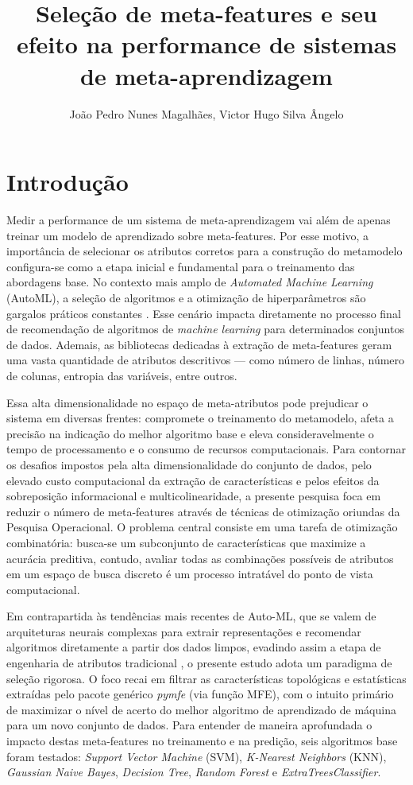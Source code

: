 \documentclass[12pt]{article}
\title{Seleção de meta-features e seu efeito na performance de sistemas de meta-aprendizagem}
\author{João Pedro Nunes Magalhães\inst{1}, Victor Hugo Silva Ângelo\inst{1}}
\begin{document}
 

\maketitle

\section{Introdução}

Medir a performance de um sistema de meta-aprendizagem \cite{vanschoren2018meta} vai além de apenas treinar um modelo de aprendizado sobre meta-features. Por esse motivo, a importância de selecionar os atributos corretos para a construção do metamodelo configura-se como a etapa inicial e fundamental para o treinamento das abordagens base. No contexto mais amplo de \textit{Automated Machine Learning} (AutoML), a seleção de algoritmos e a otimização de hiperparâmetros são gargalos práticos constantes \cite{he2021automl}. Esse cenário impacta diretamente no processo final de recomendação de algoritmos de \textit{machine learning} para determinados conjuntos de dados. Ademais, as bibliotecas dedicadas à extração de meta-features geram uma vasta quantidade de atributos descritivos — como número de linhas, número de colunas, entropia das variáveis, entre outros.

Essa alta dimensionalidade no espaço de meta-atributos pode prejudicar o sistema em diversas frentes: compromete o treinamento do metamodelo, afeta a precisão na indicação do melhor algoritmo base e eleva consideravelmente o tempo de processamento e o consumo de recursos computacionais. Para contornar os desafios impostos pela alta dimensionalidade do conjunto de dados, pelo elevado custo computacional da extração de características e pelos efeitos da sobreposição informacional e multicolinearidade, a presente pesquisa foca em reduzir o número de meta-features através de técnicas de otimização oriundas da Pesquisa Operacional. O problema central consiste em uma tarefa de otimização combinatória: busca-se um subconjunto de características que maximize a acurácia preditiva, contudo, avaliar todas as combinações possíveis de atributos em um espaço de busca discreto é um processo intratável do ponto de vista computacional.

Em contrapartida às tendências mais recentes de Auto-ML, que se valem de arquiteturas neurais complexas para extrair representações e recomendar algoritmos diretamente a partir dos dados limpos, evadindo assim a etapa de engenharia de atributos tradicional \cite{wang2023onestep}, o presente estudo adota um paradigma de seleção rigorosa. O foco recai em filtrar as características topológicas e estatísticas extraídas pelo pacote genérico \textit{pymfe} (via função MFE), com o intuito primário de maximizar o nível de acerto do melhor algoritmo de aprendizado de máquina para um novo conjunto de dados. Para entender de maneira aprofundada o impacto destas meta-features no treinamento e na predição, seis algoritmos base foram testados: \textit{Support Vector Machine} (SVM), \textit{K-Nearest Neighbors} (KNN), \textit{Gaussian Naive Bayes}, \textit{Decision Tree}, \textit{Random Forest} e \textit{ExtraTreesClassifier}.
\end{document}
